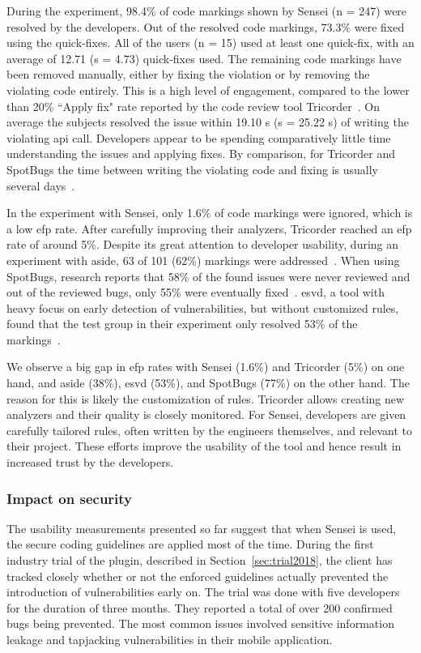 During the experiment, 98.4\% of code markings shown by Sensei (n = 247) were resolved by the developers.
Out of the resolved code markings, 73.3\% were fixed using the quick-fixes.
All of the users (n = 15) used at least one quick-fix, with an average of 12.71 (s = 4.73) quick-fixes used.
The remaining code markings have been removed manually, either by fixing the violation or by removing the violating code entirely.
This is a high level of engagement, compared to the lower than 20\% ``Apply fix" rate reported by the code review tool Tricorder~\cite{sadowski2015tricorder}.
On average the subjects resolved the issue within 19.10 s (s = 25.22 s) of writing the violating \gls{api} call.
Developers appear to be spending comparatively little time understanding the issues and applying fixes.
By comparison, for Tricorder and SpotBugs the time between writing the violating code and fixing is usually several days~\cite{sadowski2015tricorder,ayewah2007using}.

In the experiment with Sensei, only 1.6\% of code markings were ignored, which is a low \gls{efp} rate.
After carefully improving their analyzers, Tricorder reached an \gls{efp} rate of around 5\%.
Despite its great attention to developer usability, during an experiment with \gls{aside}, 63 of 101 (62\%) markings were addressed~\cite{xie2011aside}.
When using SpotBugs, research reports that 58\% of the found issues were never reviewed and out of the reviewed bugs, only 55\% were eventually fixed~\cite{ayewah2007using}.
\Gls{esvd}, a tool with heavy focus on early detection of vulnerabilities, but without customized rules, found that the test group in their experiment only resolved 53\% of the markings~\cite{sampaio2016exploring}.

We observe a big gap in \gls{efp} rates with Sensei (1.6\%) and Tricorder (5\%) on one hand, and \gls{aside} (38\%), \gls{esvd} (53\%), and SpotBugs (77\%) on the other hand.
The reason for this is likely the customization of rules.
Tricorder allows creating new analyzers and their quality is closely monitored.
For Sensei, developers are given carefully tailored rules, often written by the engineers themselves, and relevant to their project.
These efforts improve the usability of the tool and hence result in increased trust by the developers.

\subsubsection{Impact on security}
The usability measurements presented so far suggest that when Sensei is used, the secure coding guidelines are applied most of the time.
During the first industry trial of the plugin, described in Section~\ref{sec:trial2018}, the client has tracked closely whether or not the enforced guidelines actually prevented the introduction of vulnerabilities early on.
The trial was done with five developers for the duration of three months.
They reported a total of over 200 confirmed bugs being prevented.
The most common issues involved sensitive information leakage and tapjacking vulnerabilities in their mobile application.

